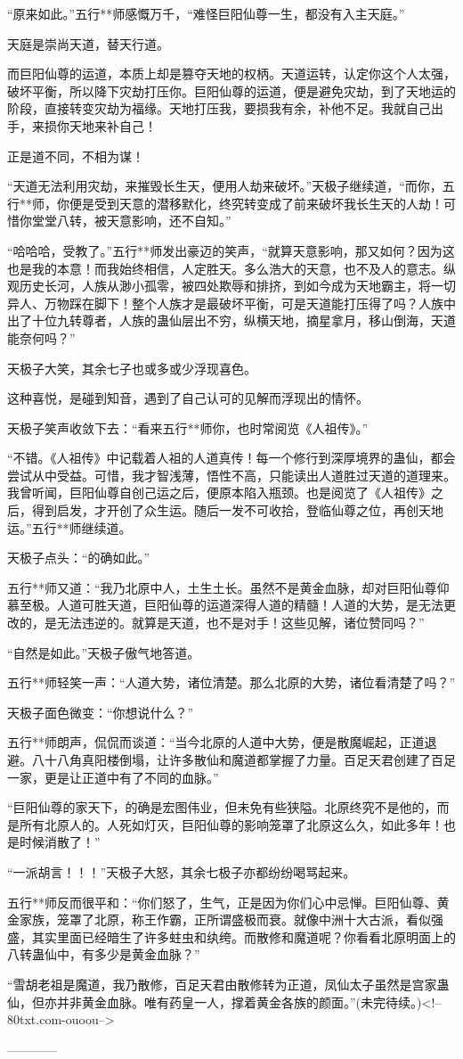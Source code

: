 \begin{this_body}
“原来如此。”五行**师感慨万千，“难怪巨阳仙尊一生，都没有入主天庭。”

天庭是崇尚天道，替天行道。

而巨阳仙尊的运道，本质上却是篡夺天地的权柄。天道运转，认定你这个人太强，破坏平衡，所以降下灾劫打压你。巨阳仙尊的运道，便是避免灾劫，到了天地运的阶段，直接转变灾劫为福缘。天地打压我，要损我有余，补他不足。我就自己出手，来损你天地来补自己！

正是道不同，不相为谋！

“天道无法利用灾劫，来摧毁长生天，便用人劫来破坏。”天极子继续道，“而你，五行**师，你便是受到天意的潜移默化，终究转变成了前来破坏我长生天的人劫！可惜你堂堂八转，被天意影响，还不自知。”

“哈哈哈，受教了。”五行**师发出豪迈的笑声，“就算天意影响，那又如何？因为这也是我的本意！而我始终相信，人定胜天。多么浩大的天意，也不及人的意志。纵观历史长河，人族从渺小孤零，被四处欺辱和排挤，到如今成为天地霸主，将一切异人、万物踩在脚下！整个人族才是最破坏平衡，可是天道能打压得了吗？人族中出了十位九转尊者，人族的蛊仙层出不穷，纵横天地，摘星拿月，移山倒海，天道能奈何吗？”

天极子大笑，其余七子也或多或少浮现喜色。

这种喜悦，是碰到知音，遇到了自己认可的见解而浮现出的情怀。

天极子笑声收敛下去：“看来五行**师你，也时常阅览《人祖传》。”

“不错。《人祖传》中记载着人祖的人道真传！每一个修行到深厚境界的蛊仙，都会尝试从中受益。可惜，我才智浅薄，悟性不高，只能读出人道胜过天道的道理来。我曾听闻，巨阳仙尊自创己运之后，便原本陷入瓶颈。也是阅览了《人祖传》之后，得到启发，才开创了众生运。随后一发不可收拾，登临仙尊之位，再创天地运。”五行**师继续道。

天极子点头：“的确如此。”

五行**师又道：“我乃北原中人，土生土长。虽然不是黄金血脉，却对巨阳仙尊仰慕至极。人道可胜天道，巨阳仙尊的运道深得人道的精髓！人道的大势，是无法更改的，是无法违逆的。就算是天道，也不是对手！这些见解，诸位赞同吗？”

“自然是如此。”天极子傲气地答道。

五行**师轻笑一声：“人道大势，诸位清楚。那么北原的大势，诸位看清楚了吗？”

天极子面色微变：“你想说什么？”

五行**师朗声，侃侃而谈道：“当今北原的人道中大势，便是散魔崛起，正道退避。八十八角真阳楼倒塌，让许多散仙和魔道都掌握了力量。百足天君创建了百足一家，更是让正道中有了不同的血脉。”

“巨阳仙尊的家天下，的确是宏图伟业，但未免有些狭隘。北原终究不是他的，而是所有北原人的。人死如灯灭，巨阳仙尊的影响笼罩了北原这么久，如此多年！也是时候消散了！”

“一派胡言！！！”天极子大怒，其余七极子亦都纷纷喝骂起来。

五行**师反而很平和：“你们怒了，生气，正是因为你们心中忌惮。巨阳仙尊、黄金家族，笼罩了北原，称王作霸，正所谓盛极而衰。就像中洲十大古派，看似强盛，其实里面已经暗生了许多蛀虫和纨绔。而散修和魔道呢？你看看北原明面上的八转蛊仙中，有多少是黄金血脉？”

“雪胡老祖是魔道，我乃散修，百足天君由散修转为正道，凤仙太子虽然是宫家蛊仙，但亦并非黄金血脉。唯有药皇一人，撑着黄金各族的颜面。”(未完待续。)<!--80txt.com-ouoou-->

------------

\end{this_body}

